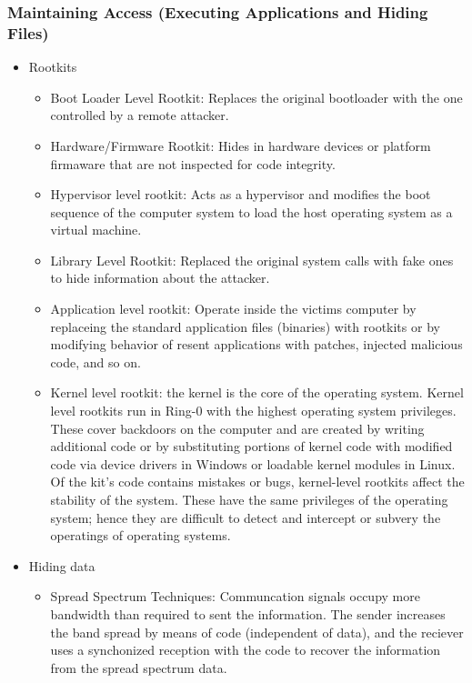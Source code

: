 \subsubsection{Maintaining Access (Executing Applications and Hiding Files)}
\begin{itemize}
    \item Rootkits
    \begin{itemize}
        \item Boot Loader Level Rootkit: Replaces the original bootloader with the one controlled by a remote attacker.
        \item Hardware/Firmware Rootkit: Hides in hardware devices or platform firmaware that are not inspected for code integrity.
        \item Hypervisor level rootkit: Acts as a hypervisor and modifies the boot sequence of the computer system to load the host operating system as a virtual machine.
        \item Library Level Rootkit: Replaced the original system calls with fake ones to hide information about the attacker.
        \item Application level rootkit: Operate inside the victims computer by replaceing the standard application files (binaries) with rootkits or by modifying behavior of resent applications with patches, injected malicious code, and so on.
        \item Kernel level rootkit: the kernel is the core of the operating system. Kernel level rootkits run in Ring-0 with the highest operating system privileges. These cover backdoors on the computer and are created by writing additional code or by substituting portions of kernel code with modified code via device drivers in Windows or loadable kernel modules in Linux. Of the kit's code contains mistakes or bugs, kernel-level rootkits affect the stability of the system. These have the same privileges of the operating system; hence they are difficult to detect and intercept or subvery the operatings of operating systems.
    \end{itemize}
    \item Hiding data
    \begin{itemize}
        \item Spread Spectrum Techniques: Communcation signals occupy more bandwidth than required to sent the information. The sender increases the band spread by means of code (independent of data), and the reciever uses a synchonized reception with the code to recover the information from the spread spectrum data.

\end{itemize}
\end{itemize}
